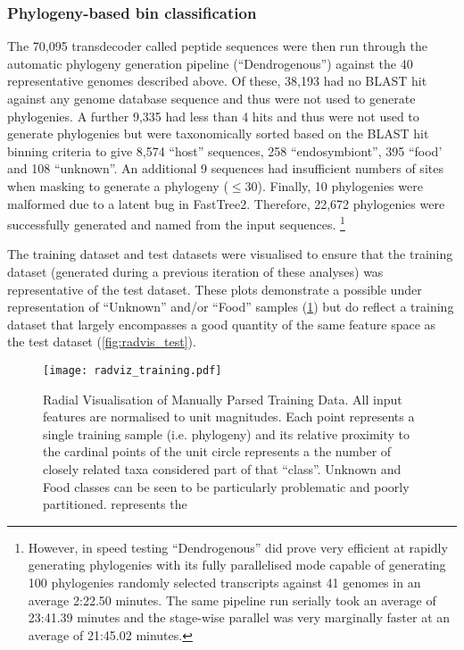 \subsubsection{Phylogeny-based bin classification}
The 70,095 transdecoder called peptide sequences were then run through
the automatic phylogeny generation pipeline (``Dendrogenous'') against the 40
representative genomes described above. 
Of these, 38,193 had no BLAST hit against any genome database sequence and thus were
not used to generate phylogenies.  A further 9,335 had less than 4 hits 
and thus were not used to generate phylogenies but were taxonomically sorted based
on the BLAST hit binning criteria to give 8,574 ``host'' sequences,  258 ``endosymbiont'',
395 ``food' and 108 ``unknown''.   
An additional 9 sequences had insufficient numbers of sites 
when masking to generate a phylogeny (\(\leq30\)).  Finally, 10 phylogenies
were malformed due to a latent bug in FastTree2.  
Therefore, 22,672 phylogenies were successfully generated and named from the input sequences.
\footnote{However, in speed testing ``Dendrogenous'' did prove very efficient at rapidly generating phylogenies with its
	fully parallelised mode capable of generating 100 phylogenies randomly selected transcripts against 41 genomes in an average 2:22.50 minutes.
	The same pipeline run serially took an average of 23:41.39 minutes and the stage-wise parallel was very marginally faster at 
	an average of 21:45.02 minutes.}

The training dataset and test datasets were visualised to ensure that the training dataset 
(generated during a previous iteration of these analyses) was representative of the 
test dataset.   These plots demonstrate a possible under representation of ``Unknown'' and/or ``Food'' samples (\cref{fig:radvis_training}) but do reflect a training dataset that largely encompasses a good quantity of the same
feature space as the test dataset (\cref{fig:radvis_test}).

\begin{figure}[h!]
		\centering
		\texttt{[image: radviz\_training.pdf]}
        \caption[Radial visualisation of training data]{Radial Visualisation of Manually Parsed Training Data. All input features are normalised to 
			unit magnitudes.  Each point represents a single training sample (i.e. phylogeny) and its relative proximity
			to the cardinal points of the unit circle represents a the number of closely related taxa considered part of
			that ``class''.  Unknown and Food classes can be seen to be particularly problematic and poorly partitioned.
			represents the}
		\label{fig:radvis_training}
	\end{figure}

